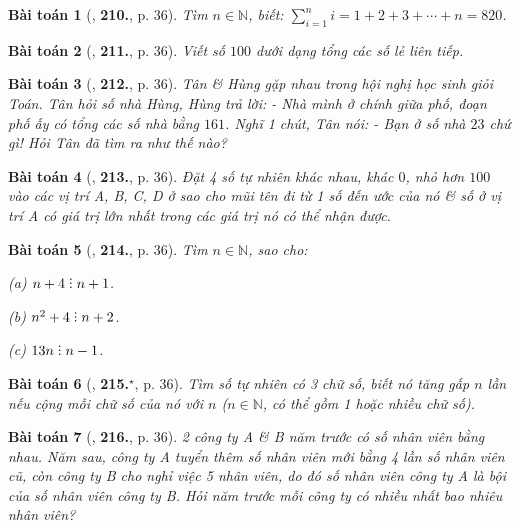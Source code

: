 \documentclass{article}
\numberwithin{equation}{section}
\newtheorem{baitoan}{Bài toán}[section]
\DeclareRobustCommand{\divby}{%
	\mathrel{\vbox{\baselineskip.65ex\lineskiplimit0pt\hbox{.}\hbox{.}\hbox{.}}}%
}
\begin{document}
\begin{baitoan}[\cite{Binh_Toan_6_tap_1}, \textbf{210.}, p. 36]
	Tìm $n\in\mathbb{N}$, biết: $\sum_{i=1}^n i = 1 + 2 + 3 + \cdots + n = 820$.
\end{baitoan}

\begin{baitoan}[\cite{Binh_Toan_6_tap_1}, \textbf{211.}, p. 36]
	Viết số $100$ dưới dạng tổng các số lẻ liên tiếp.
\end{baitoan}

\begin{baitoan}[\cite{Binh_Toan_6_tap_1}, \textbf{212.}, p. 36]
	Tân \& Hùng gặp nhau trong hội nghị học sinh giỏi Toán. Tân hỏi số nhà Hùng, Hùng trả lời: - Nhà mình ở chính giữa phố, đoạn phố ấy có tổng các số nhà bằng $161$. Nghĩ 1 chút, Tân nói: - Bạn ở số nhà $23$ chứ gì! Hỏi Tân đã tìm ra như thế nào?
\end{baitoan}

\begin{baitoan}[\cite{Binh_Toan_6_tap_1}, \textbf{213.}, p. 36]
	Đặt 4 số tự nhiên khác nhau, khác $0$, nhỏ hơn $100$ vào các vị trí A, B, C, D ở \cite[Hình 6, p. 36]{Binh_Toan_6_tap_1} sao cho mũi tên đi từ 1 số đến ước của nó \& số ở vị trí A có giá trị lớn nhất trong các giá trị nó có thể nhận được.
\end{baitoan}

\begin{baitoan}[\cite{Binh_Toan_6_tap_1}, \textbf{214.}, p. 36]
	Tìm $n\in\mathbb{N}$, sao cho:
	\begin{enumerate*}
		\item[(a)] $n + 4\divby n + 1$.
		\item[(b)] $n^2 + 4\divby n + 2$.
		\item[(c)] $13n\divby n - 1$.
	\end{enumerate*}
\end{baitoan}

\begin{baitoan}[\cite{Binh_Toan_6_tap_1}, \textbf{215.}${}^\star$, p. 36]
	Tìm số tự nhiên có 3 chữ số, biết nó tăng gấp $n$ lần nếu cộng mỗi chữ số của nó với $n$ ($n\in\mathbb{N}$, có thể gồm 1 hoặc nhiều chữ số).
\end{baitoan}

\begin{baitoan}[\cite{Binh_Toan_6_tap_1}, \textbf{216.}, p. 36]
	2 công ty A \& B năm trước có số nhân viên bằng nhau. Năm sau, công ty A tuyển thêm số nhân viên mới bằng 4 lần số nhân viên cũ, còn công ty B cho nghỉ việc 5 nhân viên, do đó số nhân viên công ty A là bội của số nhân viên công ty B. Hỏi năm trước mỗi công ty có nhiều nhất bao nhiêu nhân viên?
\end{baitoan}
\end{document}

